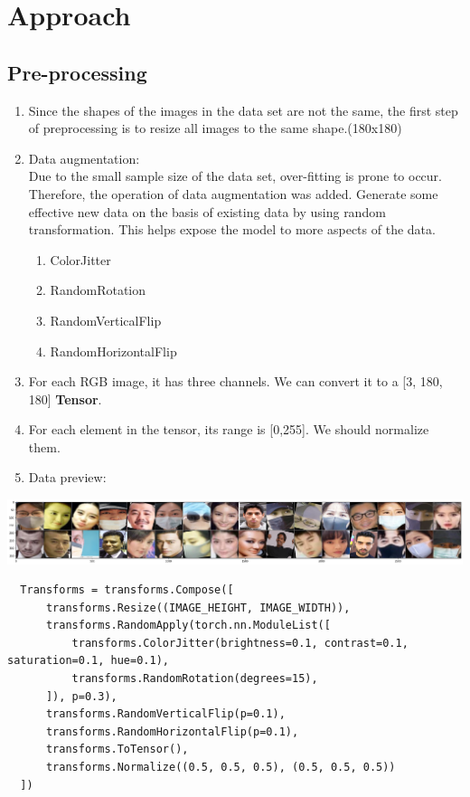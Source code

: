 \documentclass{article}
\begin{document}
\section{Approach}

  \subsection{Pre-processing}
  \begin{enumerate}
    \item Since the shapes of the images in the data set are not the same, the first step of preprocessing is to resize all images to the same shape.(180x180)
    \item Data augmentation:\\
          Due to the small sample size of the data set, over-fitting is prone to occur. Therefore, the operation of data augmentation was added. Generate some effective new data on the basis of existing data by using random transformation. This helps expose the model to more aspects of the data.

          \begin{enumerate}
            \item ColorJitter
            \item RandomRotation
            \item RandomVerticalFlip
            \item RandomHorizontalFlip
          \end{enumerate}
    \item For each RGB image, it has three channels. We can convert it to a [3, 180, 180] \textbf{Tensor}.
    \item For each element in the tensor, its range is [0,255]. We should normalize them.
    \item Data preview:
  \end{enumerate}
  \begin{center}
    \includegraphics[width=15cm]{preview.png}
  \end{center}
  \begin{lstlisting}
  Transforms = transforms.Compose([
      transforms.Resize((IMAGE_HEIGHT, IMAGE_WIDTH)),
      transforms.RandomApply(torch.nn.ModuleList([
          transforms.ColorJitter(brightness=0.1, contrast=0.1, saturation=0.1, hue=0.1),
          transforms.RandomRotation(degrees=15),
      ]), p=0.3),
      transforms.RandomVerticalFlip(p=0.1),
      transforms.RandomHorizontalFlip(p=0.1),
      transforms.ToTensor(),
      transforms.Normalize((0.5, 0.5, 0.5), (0.5, 0.5, 0.5))
  ])
  \end{lstlisting}
  
\end{document}
